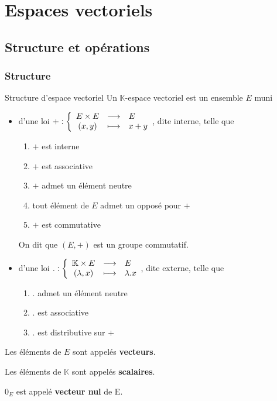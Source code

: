
\section{Espaces vectoriels}

\subsection{Structure et opérations}

    \subsubsection{Structure}

    \begin{defi}{Structure d’espace vectoriel}{}
        Un $\mathbb{K}$-espace vectoriel est un ensemble $E$ muni 
        \begin{itemize}
            \item d’une loi $\fonction{+}{E \times E}{E}{(x,y)}{x + y}$, dite interne, telle que \begin{enumerate}
                \item $+$ est interne
                \item $+$ est associative
                \item $+$ admet un élément neutre
                \item tout élément de $E$ admet un opposé pour $+$
                \item $+$ est commutative
            \end{enumerate}
            On dit que $(E,+)$ est un groupe commutatif.
            \item d’une loi $\fonction{.}{\mathbb{K} \times E}{E}{(\lambda,x)}{\lambda . x}$, dite externe, telle que \begin{enumerate}
                \item $.$ admet un élément neutre
                \item $.$ est associative
                \item $.$ est distributive sur $+$
            \end{enumerate}
        \end{itemize}
        Les éléments de $E$ sont appelés \textbf{vecteurs}. 
        
        Les éléments de $\mathbb{K}$ sont appelés \textbf{scalaires}. 
        
        $0_E$ est appelé \textbf{vecteur nul} de E.
    \end{defi}

